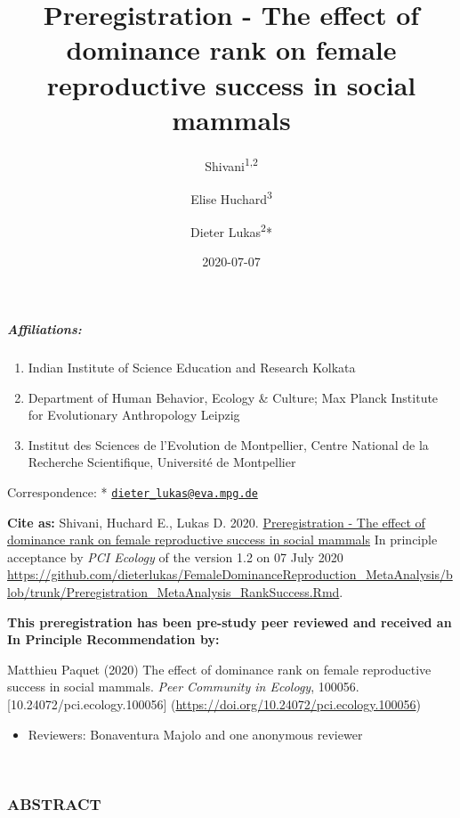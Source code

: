 \documentclass[]{article}
\title{Preregistration - The effect of dominance rank on female reproductive
success in social mammals}
\author{Shivani\textsuperscript{1,2} \and Elise Huchard\textsuperscript{3} \and Dieter Lukas\textsuperscript{2}*}
\date{2020-07-07}
\providecommand{\tightlist}{%
  \setlength{\itemsep}{0pt}\setlength{\parskip}{0pt}}
\let\oldsubparagraph\subparagraph
\renewcommand{\subparagraph}[1]{\oldsubparagraph{#1}\mbox{}}
\begin{document}
\maketitle

\hypertarget{affiliations}{%
\subparagraph{Affiliations:}\label{affiliations}}

\begin{enumerate}
\def\labelenumi{\arabic{enumi}.}
\tightlist
\item
  Indian Institute of Science Education and Research Kolkata
\item
  Department of Human Behavior, Ecology \& Culture; Max Planck Institute
  for Evolutionary Anthropology Leipzig
\item
  Institut des Sciences de l'Evolution de Montpellier, Centre National
  de la Recherche Scientifique, Université de Montpellier
\end{enumerate}

Correspondence: *
\href{mailto:dieter_lukas@eva.mpg.de}{\nolinkurl{dieter\_lukas@eva.mpg.de}}

\textbf{Cite as:} Shivani, Huchard E., Lukas D. 2020.
\href{https://dieterlukas.github.io/Preregistration_MetaAnalysis_RankSuccess.html}{Preregistration
- The effect of dominance rank on female reproductive success in social
mammals} In principle acceptance by \emph{PCI Ecology} of the version
1.2 on 07 July 2020
\url{https://github.com/dieterlukas/FemaleDominanceReproduction_MetaAnalysis/blob/trunk/Preregistration_MetaAnalysis_RankSuccess.Rmd}.

\textbf{This preregistration has been pre-study peer reviewed and
received an In Principle Recommendation by:}

Matthieu Paquet (2020) The effect of dominance rank on female
reproductive success in social mammals. \emph{Peer Community in
Ecology}, 100056. {[}10.24072/pci.ecology.100056{]}
(\url{https://doi.org/10.24072/pci.ecology.100056})

\begin{itemize}
\tightlist
\item
  Reviewers: Bonaventura Majolo and one anonymous reviewer
\end{itemize}

~

\hypertarget{abstract}{%
\subsubsection{ABSTRACT}\label{abstract}}
\end{document}
